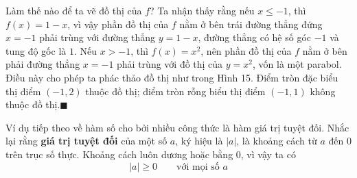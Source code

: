 \begin{minipage}[t]{0.708\textwidth}
    Làm thế nào để ta vẽ đồ thị của $f$? Ta nhận thấy rằng nếu $x \leqslant -1$, thì $f(x) = 1 - x$, vì vậy phần đồ thị của $f$ nằm ở bên trái đường thẳng đứng $x = -1$ phải trùng với đường thẳng $y = 1 - x$, đường thẳng có hệ số góc $-1$ và tung độ gốc là $1$. Nếu $x > -1$, thì $f(x) = x^2$, nên phần đồ thị của $f$ nằm ở bên phải đường thẳng $x = -1$ phải trùng với đồ thị của $y = x^2$, vốn là một parabol. Điều này cho phép ta phác thảo đồ thị như trong Hình 15. Điểm tròn đặc biểu thị điểm $(-1, 2)$ thuộc đồ thị; điểm tròn rỗng biểu thị điểm $(-1, 1)$ không thuộc đồ thị.\hfill{\color{stewartcyan}$\blacksquare$}

    \vspace{0.6em}
    Ví dụ tiếp theo về hàm số cho bởi nhiều công thức là hàm giá trị tuyệt đối. Nhắc lại rằng \textbf{giá trị tuyệt đối} của một số $a$, ký hiệu là $|a|$, là khoảng cách từ $a$ đến 0 trên trục số thực. Khoảng cách luôn dương hoặc bằng 0, vì vậy ta có
    \[
    |a| \geqslant 0 \qquad \text{với mọi số } a
    \]
\end{minipage}